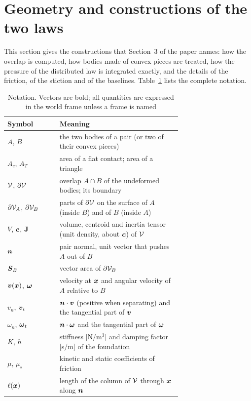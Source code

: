 \section{Geometry and constructions of the two laws}\label{sup:geometry}


This section gives the constructions that Section~3 of the paper names: how the overlap is
computed, how bodies made of convex pieces are treated, how the pressure of the distributed law
is integrated exactly, and the details of the friction, of the stiction and of the baselines.
Table~\ref{tab:notation-full} lists the complete notation.

\begin{table}[!htbp]
\caption{Notation. Vectors are bold; all quantities are expressed in the world frame unless a
frame is named}\label{tab:notation-full}
\footnotesize
\begin{tabular}{@{}lp{0.70\linewidth}@{}}
\toprule
Symbol & Meaning \\
\midrule
$A$, $B$ & the two bodies of a pair (or two of their convex pieces) \\
$A_c$, $A_T$ & area of a flat contact; area of a triangle \\
$\mathcal{V}$, $\partial\mathcal{V}$ & overlap $A\cap B$ of the undeformed bodies; its boundary \\
$\partial\mathcal{V}_A$, $\partial\mathcal{V}_B$ & parts of $\partial\mathcal{V}$ on the surface of $A$ (inside $B$) and of $B$ (inside $A$) \\
$V$, $\boldsymbol{c}$, $\mathbf{J}$ & volume, centroid and inertia tensor (unit density, about $\boldsymbol{c}$) of $\mathcal{V}$ \\
$\boldsymbol{n}$ & pair normal, unit vector that pushes $A$ out of $B$ \\
$\boldsymbol{S}_B$ & vector area of $\partial\mathcal{V}_B$ \\
$\boldsymbol{v}(\boldsymbol{x})$, $\boldsymbol{\omega}$ & velocity at $\boldsymbol{x}$ and angular velocity of $A$ relative to $B$ \\
$v_n$, $\boldsymbol{v}_t$ & $\boldsymbol{n}\cdot\boldsymbol{v}$ (positive when separating) and the tangential part of $\boldsymbol{v}$ \\
$\omega_n$, $\boldsymbol{\omega}_t$ & $\boldsymbol{n}\cdot\boldsymbol{\omega}$ and the tangential part of $\boldsymbol{\omega}$ \\
$K$, $h$ & stiffness [N/m$^3$] and damping factor [s/m] of the foundation \\
$\mu$, $\mu_s$ & kinetic and static coefficients of friction \\
$\ell(\boldsymbol{x})$ & length of the column of $\mathcal{V}$ through $\boldsymbol{x}$ along $\boldsymbol{n}$ \\

\end{tabular}
\end{table}
